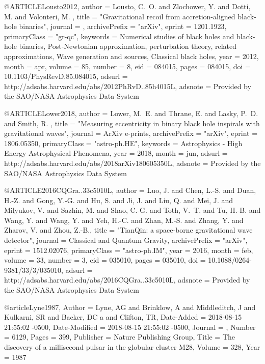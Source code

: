 \documentclass[twocolumn,tighten]{aastex63}
\begin{document}
{{{{{@ARTICLE{Lousto2012,
   author = {{Lousto}, C.~O. and {Zlochower}, Y. and {Dotti}, M. and {Volonteri}, M.
	},
    title = "{Gravitational recoil from accretion-aligned black-hole binaries}",
  journal = {\prd},
archivePrefix = "arXiv",
   eprint = {1201.1923},
 primaryClass = "gr-qc",
 keywords = {Numerical studies of black holes and black-hole binaries, Post-Newtonian approximation, perturbation theory, related approximations, Wave generation and sources, Classical black holes},
     year = 2012,
    month = apr,
   volume = 85,
   number = 8,
      eid = {084015},
    pages = {084015},
      doi = {10.1103/PhysRevD.85.084015},
   adsurl = {http://adsabs.harvard.edu/abs/2012PhRvD..85h4015L},
  adsnote = {Provided by the SAO/NASA Astrophysics Data System}
}

@ARTICLE{Lower2018,
   author = {{Lower}, M.~E. and {Thrane}, E. and {Lasky}, P.~D. and {Smith}, R.
	},
    title = "{Measuring eccentricity in binary black hole inspirals with gravitational waves}",
  journal = {ArXiv e-prints},
archivePrefix = "arXiv",
   eprint = {1806.05350},
 primaryClass = "astro-ph.HE",
 keywords = {Astrophysics - High Energy Astrophysical Phenomena},
     year = 2018,
    month = jun,
   adsurl = {http://adsabs.harvard.edu/abs/2018arXiv180605350L},
  adsnote = {Provided by the SAO/NASA Astrophysics Data System}
}

@ARTICLE{2016CQGra..33c5010L,
   author = {{Luo}, J. and {Chen}, L.-S. and {Duan}, H.-Z. and {Gong}, Y.-G. and 
	{Hu}, S. and {Ji}, J. and {Liu}, Q. and {Mei}, J. and {Milyukov}, V. and 
	{Sazhin}, M. and {Shao}, C.-G. and {Toth}, V.~T. and {Tu}, H.-B. and 
	{Wang}, Y. and {Wang}, Y. and {Yeh}, H.-C. and {Zhan}, M.-S. and 
	{Zhang}, Y. and {Zharov}, V. and {Zhou}, Z.-B.},
    title = "{TianQin: a space-borne gravitational wave detector}",
  journal = {Classical and Quantum Gravity},
archivePrefix = "arXiv",
   eprint = {1512.02076},
 primaryClass = "astro-ph.IM",
     year = 2016,
    month = feb,
   volume = 33,
   number = 3,
      eid = {035010},
    pages = {035010},
      doi = {10.1088/0264-9381/33/3/035010},
   adsurl = {http://adsabs.harvard.edu/abs/2016CQGra..33c5010L},
  adsnote = {Provided by the SAO/NASA Astrophysics Data System}
}

@article{Lyne1987,
	Author = {Lyne, AG and Brinklow, A and Middleditch, J and Kulkarni, SR and Backer, DC a and Clifton, TR},
	Date-Added = {2018-08-15 21:55:02 -0500},
	Date-Modified = {2018-08-15 21:55:02 -0500},
	Journal = {\nat},
	Number = {6129},
	Pages = {399},
	Publisher = {Nature Publishing Group},
	Title = {The discovery of a millisecond pulsar in the globular cluster M28},
	Volume = {328},
	Year = {1987}}

}}}}}
\end{document}

